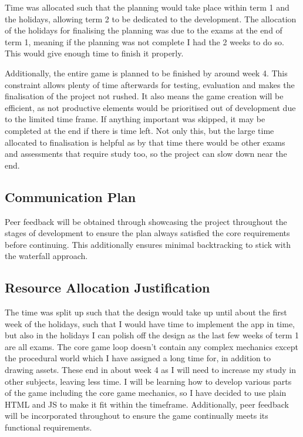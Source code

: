 \documentclass[14pt]{article}
\begin{document}
Time was allocated such that the planning would take place within term 1 and the holidays, allowing term 2 to be dedicated to the development. The allocation of the holidays for finalising the planning was due to the exams at the end of term 1, meaning if the planning was not complete I had the 2 weeks to do so. This would give enough time to finish it properly.

Additionally, the entire game is planned to be finished by around week 4. This constraint allows plenty of time afterwards for testing, evaluation and makes the finalisation of the project not rushed. It also means the game creation will be efficient, as not productive elements would be prioritised out of development due to the limited time frame. If anything important was skipped, it may be completed at the end if there is time left. Not only this, but the large time allocated to finalisation is helpful as by that time there would be other exams and assessments that require study too, so the project can slow down near the end.

\subsection{Communication Plan}
Peer feedback will be obtained through showcasing the project throughout the stages of development to ensure the plan always satisfied the core requirements before continuing.
This additionally ensures minimal backtracking to stick with the waterfall approach.

\subsection{Resource Allocation Justification}
The time was split up such that the design would take up until about the first week of the holidays, such that I would have time to implement the app in time, but also in the holidays I can polish off the design as the last few weeks of term 1 are all exams. The core game loop doesn't contain any complex mechanics except the procedural world which I have assigned a long time for, in addition to drawing assets. These end in about week 4 as I will need to increase my study in other subjects, leaving less time.
I will be learning how to develop various parts of the game including the core game mechanics, so I have decided to use plain HTML and JS to make it fit within the timeframe.
Additionally, peer feedback will be incorporated throughout to ensure the game continually meets its functional requirements.
\end{document}
